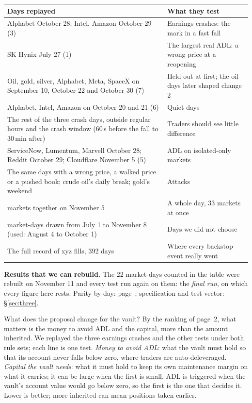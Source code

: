 {\small
\begin{tabularx}{\textwidth}{@{}>{\raggedright\arraybackslash}X>{\raggedright\arraybackslash}p{6.4cm}@{}}
\toprule
Days replayed & What they test\\
\midrule
Alphabet October 28; Intel, Amazon October 29 (3) & Earnings crashes: the mark in a fast fall\\
SK Hynix July 27 (1) & The largest real ADL: a wrong price at a reopening\\
Oil, gold, silver, Alphabet, Meta, SpaceX on September 10, October 22 and October 30 (7) & Held out at first; the oil days later shaped change 2\\
Alphabet, Intel, Amazon on October 20 and 21 (6) & Quiet days\\
The rest of the three crash days, outside regular hours and the crash window (60\,s before the fall to 30\,min after) & Traders should see little difference\\
ServiceNow, Lumentum, Marvell October 28; Reddit October 29; Cloudflare November 5 (5) & ADL on isolated-only markets\\
The same days with a wrong price, a walked price or a pushed book; crude oil's daily break; gold's weekend & Attacks\\
33 markets together on November 5 & A whole day, 33 markets at once\\
30 market-days drawn from July 1 to November 8 (used: August 4 to October 1) & Days we did not choose\\
The full record of xyz fills, 392 days & Where every backstop event really went\\
\bottomrule
\end{tabularx}}

\vspace{1ex}
\textbf{Results that we can rebuild.} The 22 market-days counted in the table were rebuilt on November 11 and every test run again on them: the \emph{final run}, on which every figure here rests. Parity by day: page~\pageref{sec:appintro}; specification and test vector: \S\ref{sec:three}.



\label{sec:res-mark}

What does the proposal change for the vault? By the ranking of page~2, what matters is the money to avoid ADL and the capital, more than the amount inherited. We replayed the three earnings crashes and the other tests under both rule sets; each line is one test. \emph{Money to avoid ADL}: what the vault must hold so that its account never falls below zero, where traders are auto-deleveraged. \emph{Capital the vault needs}: what it must hold to keep its own maintenance margin on what it carries; it can be large when the first is small. ADL is triggered when the vault's account value would go below zero, so the first is the one that decides it. Lower is better; more inherited can mean positions taken earlier.


